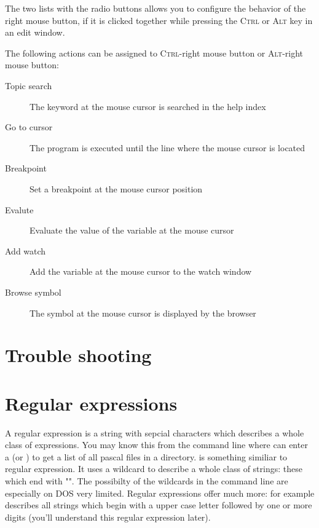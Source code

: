 The two lists with the radio buttons allows you
to configure the behavior of the
right mouse button, if it is clicked together while
pressing the \textsc{Ctrl} or
\textsc{Alt} key in an edit window.

The following actions can be assigned to \textsc{Ctrl}-right mouse button or
\textsc{Alt}-right mouse button:

\begin{description}
\item [Topic search] The keyword at the mouse cursor is searched in the
help index
\item [Go to cursor] The program is executed until the line where
the mouse cursor is located
\item [Breakpoint] Set a breakpoint at the mouse cursor position
\item [Evalute] Evaluate the value of the variable at the mouse
cursor
\item [Add watch] Add the variable at the mouse cursor to the
watch window
\item [Browse symbol] The symbol at the mouse cursor is displayed
by the browser
\end{description}


\section{Trouble shooting}

\section{Regular expressions}
\label{se:regexpr}
A regular expression is a string with sepcial characters which describes 
a whole class of expressions. You may know this from the command line
where can enter a  (or ) to get a list
of all pascal files in a directory.  is something 
similiar to regular expression. It uses a wildcard to describe a whole 
class of strings: these which end with "". The possibilty 
of the wildcards in the command line are especially on DOS very limited. 
Regular expressions offer much more: for example \file{[A-Z][0-9]+} 
describes all strings which begin with a upper case letter followed by
one or more digits (you'll understand this regular expression later).

